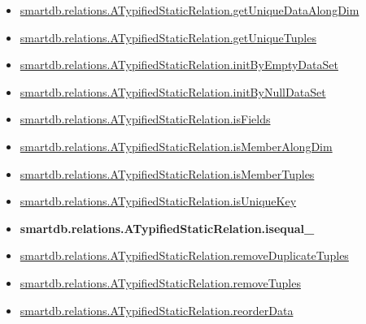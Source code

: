 \documentclass[letterpaper,10pt,english]{sphinxmanual}
\begin{document}
\begin{itemize}
\item {} 
{\hyperref[chap_functions:smartdb-relations-atypifiedstaticrelation-getuniquedataalongdim]{smartdb.relations.ATypifiedStaticRelation.getUniqueDataAlongDim}}

\item {} 
{\hyperref[chap_functions:smartdb-relations-atypifiedstaticrelation-getuniquetuples]{smartdb.relations.ATypifiedStaticRelation.getUniqueTuples}}

\item {} 
{\hyperref[chap_functions:smartdb-relations-atypifiedstaticrelation-initbyemptydataset]{smartdb.relations.ATypifiedStaticRelation.initByEmptyDataSet}}

\item {} 
{\hyperref[chap_functions:smartdb-relations-atypifiedstaticrelation-initbynulldataset]{smartdb.relations.ATypifiedStaticRelation.initByNullDataSet}}

\item {} 
{\hyperref[chap_functions:smartdb-relations-atypifiedstaticrelation-isfields]{smartdb.relations.ATypifiedStaticRelation.isFields}}

\item {} 
{\hyperref[chap_functions:smartdb-relations-atypifiedstaticrelation-ismemberalongdim]{smartdb.relations.ATypifiedStaticRelation.isMemberAlongDim}}

\item {} 
{\hyperref[chap_functions:smartdb-relations-atypifiedstaticrelation-ismembertuples]{smartdb.relations.ATypifiedStaticRelation.isMemberTuples}}

\item {} 
{\hyperref[chap_functions:smartdb-relations-atypifiedstaticrelation-isuniquekey]{smartdb.relations.ATypifiedStaticRelation.isUniqueKey}}

\item {} 
{\color{red}\bfseries{}smartdb.relations.ATypifiedStaticRelation.isequal\_}

\item {} 
{\hyperref[chap_functions:smartdb-relations-atypifiedstaticrelation-removeduplicatetuples]{smartdb.relations.ATypifiedStaticRelation.removeDuplicateTuples}}

\item {} 
{\hyperref[chap_functions:smartdb-relations-atypifiedstaticrelation-removetuples]{smartdb.relations.ATypifiedStaticRelation.removeTuples}}

\item {} 
{\hyperref[chap_functions:smartdb-relations-atypifiedstaticrelation-reorderdata]{smartdb.relations.ATypifiedStaticRelation.reorderData}}


\end{itemize}
\end{document}

